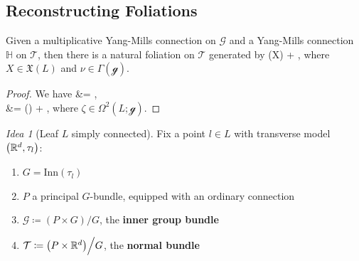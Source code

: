 \documentclass[hyperref={pdfpagelabels=false}]{beamer}
\def\bas#1\eas{\begin{align*}#1\end{align*}}
\theoremstyle{plain}
\theoremstyle{remark}
\newtheorem*{idea}{Idea}
\begin{document}





\subsection{Reconstructing Foliations}
{


\begin{frame}
\begin{theorem}[{[C.\ L.-G., S.-R.\ F.]}]
Given a multiplicative Yang-Mills connection on $\mathcal{G}$ and a Yang-Mills connection $\mathbb{H}$ on $\mathcal{T}$, then there is a natural foliation on $\mathcal{T}$ generated by 
\bas
\mathbb{H}(X) + \overline{\nu},
\eas
where $X \in \mathfrak{X}(L)$ and $\nu \in \Gamma(\mathcal{g})$.
\end{theorem}
\pause
\begin{proof}
We have
\bas
\mleft[ \mathbb{H}(X), \overline{\nu} \mright]
&=
,
\\
&=
\mleft(\mright)
	+ ,
\eas
where $\zeta \in \Omega^2(L; \mathcal{g})$.	
\end{proof}
\end{frame}

\begin{frame}
\begin{idea}[Leaf $L$ simply connected]
Fix a point $l \in L$ with transverse model $\mleft(\mathbb{R}^d, \tau_l\mright)$:
\begin{enumerate}
	\item $G = \mathrm{Inn}(\tau_l)$
	\pause
	\item $P$ a principal $G$-bundle, equipped with an ordinary connection
	\pause
	\item $\mathcal{G} \coloneqq (P \times G) \Big/ G$, the \textbf{inner group bundle}
	\pause
	\item $\mathcal{T} \coloneqq \mleft(P \times \mathbb{R}^d\mright) \Big/ G$, the \textbf{normal bundle}
\end{enumerate}
\end{idea}


\end{frame}}
\end{document}
